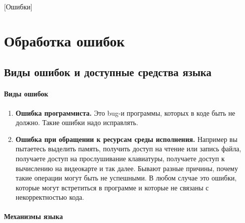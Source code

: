 [Ошибки]


\section{Обработка ошибок}

\subsection{Виды ошибок и доступные средства языка}

\paragraph{Виды ошибок}

\begin{enumerate}
\item \textbf{Ошибка программиста.}
Это bug-и программы, которых в коде быть не должно.
Такие ошибки надо исправлять.

\item \textbf{Ошибка при обращении к ресурсам среды исполнения.}
Например вы пытаетесь выделить память, получить доступ на чтение или запись файла, получаете доступ на прослушивание клавиатуры, получаете доступ к вычислению на видеокарте и так далее.
Бывают разные причины, почему такие операции могут быть не успешными.
В любом случае это ошибки, которые могут встретиться в  программе и которые не связаны с некорректностью кода.
\end{enumerate}

\paragraph{Механизмы языка}


